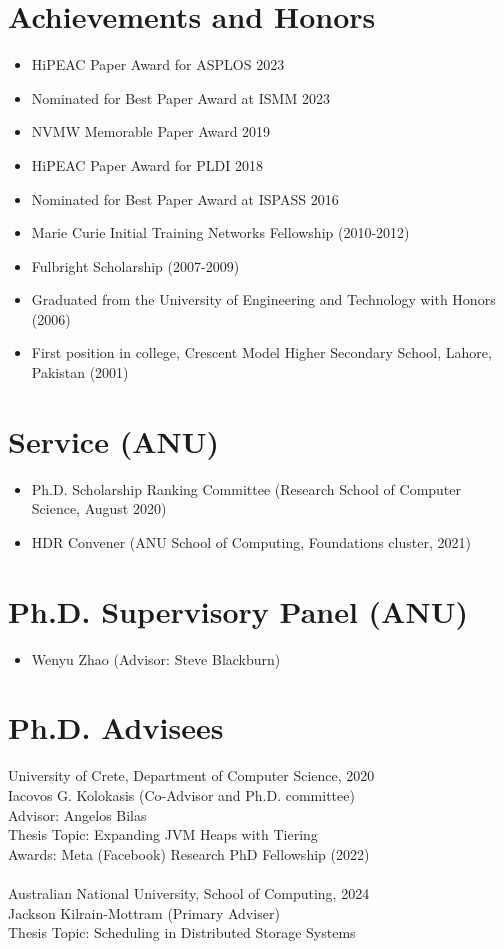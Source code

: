 \documentclass[singlecolumn,singlespace,11pt]{article}
\begin{document}
\section*{Achievements and Honors}
\begin{itemize}
\item HiPEAC Paper Award for ASPLOS 2023
\item Nominated for Best Paper Award at ISMM 2023
\item NVMW Memorable Paper Award 2019
\item HiPEAC Paper Award for PLDI 2018 
\item Nominated for Best Paper Award at ISPASS 2016 
\item Marie Curie Initial Training Networks Fellowship (2010-2012)
\item Fulbright Scholarship (2007-2009)
\item Graduated from the University of Engineering and Technology with Honors (2006)
\item First position in college, Crescent Model Higher Secondary School, Lahore, Pakistan (2001)
\end{itemize}

\section*{Service (ANU)}

\begin{itemize}
\item Ph.D. Scholarship Ranking Committee (Research School of Computer Science, August 2020)
\item HDR Convener (ANU School of Computing, Foundations cluster, 2021)
\end{itemize}

\section*{Ph.D. Supervisory Panel (ANU)}

\begin{itemize}
\item Wenyu Zhao (Advisor: Steve Blackburn)
\end{itemize}

\section*{Ph.D. Advisees}
University of Crete, Department of Computer Science, 2020 \\
\indent Iacovos G. Kolokasis (Co-Advisor and Ph.D. committee) \\
\indent Advisor: Angelos Bilas \\ 
\indent Thesis Topic: Expanding JVM Heaps with Tiering \\ 
\indent Awards: Meta (Facebook) Research PhD Fellowship (2022)
\\
\\
Australian National University, School of Computing, 2024\\
\indent Jackson Kilrain-Mottram (Primary Adviser) \\
\indent Thesis Topic: Scheduling in Distributed Storage Systems
\end{document}
